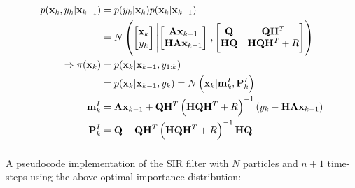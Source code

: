 \documentclass[a4paper,oneside,article]{memoir}
\begin{document}
\begin{align}
	p(\mathbf{x}_k,y_{k}|\mathbf{x}_{k-1})&=p(y_k|\mathbf{x}_k)p(\mathbf{x}_k|\mathbf{x}_{k-1})\\
	&=N\left(
	\begin{bmatrix}
		\mathbf{x}_k\\y_{k}
	\end{bmatrix}\left\vert
	\begin{bmatrix}
		\mathbf{A}\mathbf{x}_{k-1}\\
		\mathbf{H}\mathbf{A}\mathbf{x}_{k-1}
	\end{bmatrix}
	\right.,
	\begin{bmatrix}
		\mathbf{Q} & \mathbf{Q}\mathbf{H}^T\\
		\mathbf{H}\mathbf{Q} & \mathbf{H}\mathbf{Q}\mathbf{H}^T+R  
	\end{bmatrix}
	\right)\\
	\Rightarrow
	\pi(\mathbf{x}_k)&=p(\mathbf{x}_k|\mathbf{x}_{k-1},y_{1:k})\\
	&=p(\mathbf{x}_k|\mathbf{x}_{k-1},y_{k}) =
	N\left(\mathbf{x}_k|\mathbf{m}^I_k,\mathbf{P}^I_k\right)\\ \mathbf{m}^I_k&=\mathbf{A}\mathbf{x}_{k-1}+\mathbf{Q}\mathbf{H}^T\left(\mathbf{H}\mathbf{Q}\mathbf{H}^T+R\right)^{-1}\left(y_k-\mathbf{H}\mathbf{A}\mathbf{x}_{k-1}\right)\\
	\mathbf{P}^I_k&=\mathbf{Q}-\mathbf{Q}\mathbf{H}^T\left(\mathbf{H}\mathbf{Q}\mathbf{H}^T+R\right)^{-1}\mathbf{H}\mathbf{Q}
\end{align}

\subsubsection{}

A pseudocode implementation of the SIR filter with $N$ particles 
and $n+1$ time-steps using the above optimal importance distribution:
\end{document}
